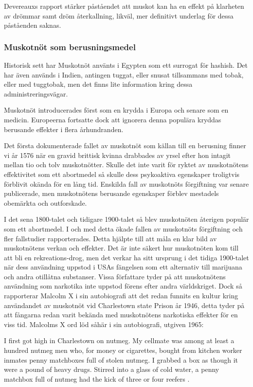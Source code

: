 Devereauxs rapport stärker påståendet att muskot kan ha en effekt på klarheten av drömmar samt dröm återkallning,
likväl, mer definitivt underlag för dessa påståenden saknas.


\subsubsection{Muskotnöt som berusningsmedel}

Historisk sett har Muskotnöt använts i Egypten som ett surrogat för hashish. Det har även används i Indien, antingen
tuggat, eller snusat tillsammans med tobak, eller med tuggtobak, men det finns lite information kring dessa administreringsvägar.

Muskotnöt introducerades först som en krydda i Europa och senare som en medicin. Europeerna fortsatte dock att ignorera denna populära kryddas berusande effekter i flera århundranden.

Det första dokumenterade fallet av muskotnöt som källan till en berusning finner vi år 1576 när en gravid brittisk kvinna drabbades av yrsel efter hon intagit mellan tio och tolv muskotnötter. \cite{stein2001nutmeg}
Skulle det inte varit för ryktet av muskotnötens effektivitet som ett abortmedel så skulle dess
psykoaktiva egenskaper troligtvis förblivit okända för en lång tid.
Enskilda fall av muskotnöts förgiftning var senare publicerade, men muskotnötens berusande egenskaper förblev mestadels obemärkta och outforskade.

I det sena 1800-talet och tidigare 1900-talet så blev muskotnöten återigen populär som ett abortmedel. I och med detta ökade fallen av muskotnöts förgiftning och fler fallstudier rapporterades.
Detta hjälpte till att måla en klar bild av muskotnötens verkan och effekter.
Det är inte säkert hur muskotnöten kom till att bli en rekreations-drog, men det verkar ha sitt
ursprung i det tidiga 1900-talet när dess användning uppstod i USAs fängelsen som ett alternativ
till marijuana och andra otillåtna substanser.
Vissa författare tyder på att muskotnötens användning som narkotika inte uppstod förens efter
andra världskriget. Dock så rapporterar Malcolm X i sin autobiografi att det redan funnits en kultur kring
användandet av muskotnöt vid Charlestown state Prison år 1946, detta tyder på att fångarna redan
varit bekända med muskotnötens narkotiska effekter för en viss tid.
Malcolms X ord löd såhär i sin autobiografi, utgiven 1965:
\begin{displayquote}

I first got high in Charlestown on nutmeg. My cellmate was among at least a
hundred nutmeg men who, for money or cigarettes, bought from kitchen worker
inmates penny matchboxes full of stolen nutmeg. I grabbed a box as though it
were a pound of heavy drugs. Stirred into a glass of cold water, a penny
matchbox full of nutmeg had the kick of three or four reefers \cite{malcolmx}.

\end{displayquote}

